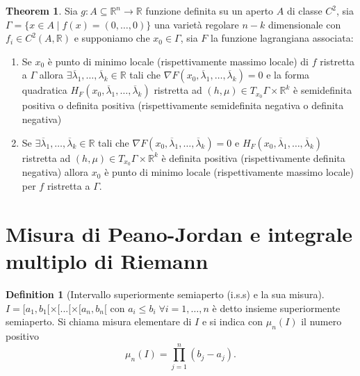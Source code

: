 \documentclass[leqno]{article}
\theoremstyle{definition}
\newtheorem{definition}{Definition}[section]
\numberwithin{equation}{section}
\newtheorem{theorem}{Theorem}[section]
\theoremstyle{remark}
\begin{document}
	\begin{theorem}
		Sia $g:A\subseteq \mathbb{R}^n \rightarrow \mathbb{R}$ funzione definita su un aperto $A$ di classe $C^2$, sia $\Gamma =\{ x \in A \; | \; f(x)=(0,\dots,0)\}$ una varietà regolare $n-k$ dimensionale con $f_i\in C^2(A,\mathbb{R})$ e supponiamo che $x_0\in \Gamma$, sia $F$ la funzione lagrangiana associata:
		\begin{enumerate}
			\item Se $x_0$ è punto di minimo locale (rispettivamente massimo locale) di $f$ ristretta a $\Gamma$ allora $\exists \overline{\lambda}_1,\dots,\overline{\lambda}_k \in \mathbb{R}$ tali che $\nabla F(x_0,\overline{\lambda}_1,\dots,\overline{\lambda}_k)=0$ e la forma quadratica $H_F(x_0,\overline{\lambda}_1,\dots,\overline{\lambda}_k)$ ristretta ad $(h,\mu)\in T_{x_0}\Gamma \times \mathbb{R}^k$ è semidefinita positiva o definita positiva (rispettivamente semidefinita negativa o definita negativa)
			\item Se $\exists \overline{\lambda}_1,\dots,\overline{\lambda}_k \in \mathbb{R}$ tali che $\nabla F (x_0,\overline{\lambda}_1,\dots,\overline{\lambda}_k)=0$ e $H_F(x_0,\overline{\lambda}_1,\dots,\overline{\lambda}_k)$ ristretta ad $(h,\mu)\in T_{x_0}\Gamma \times \mathbb{R}^k$ è definita positiva (rispettivamente definita negativa) allora $x_0$ è punto di minimo locale (rispettivamente massimo locale) per $f$ ristretta a $\Gamma$.
		\end{enumerate}
	\end{theorem}
	\section{Misura di Peano-Jordan e integrale multiplo di Riemann}
	\begin{definition}[Intervallo superiormente semiaperto (i.s.s) e la sua misura] 
		$I=[a_1,b_1[\times[...[\times[a_n,b_n[$ con $a_i\le b_i \; \forall i=1,\dots,n$ è detto insieme superiormente semiaperto. Si chiama misura elementare di $I$ e si indica con $\mu_n(I)$ il numero positivo 
		\[\mu_n(I)=\prod_{j=1}^n(b_j-a_j).\]
		
	\end{definition}
	
\end{document}
